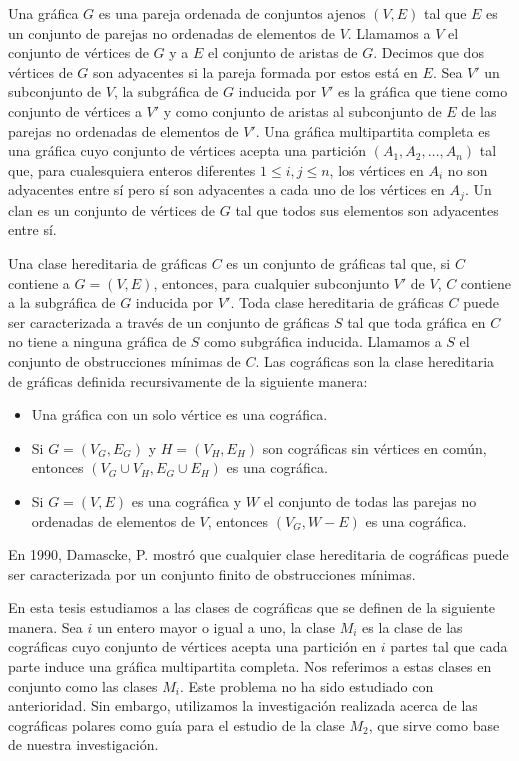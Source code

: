 Una gráfica $G$ es una pareja ordenada de conjuntos ajenos $(V,E)$ tal que $E$ es un conjunto de parejas no ordenadas de elementos de $V$. Llamamos a $V$ el conjunto de vértices de $G$ y a $E$ el conjunto de aristas de $G$. Decimos que dos vértices de $G$ son adyacentes si la pareja formada por estos está en $E$. Sea $V'$ un subconjunto de $V$, la subgráfica de $G$ inducida por $V'$ es la gráfica que tiene como conjunto de vértices a $V'$ y como conjunto de aristas al subconjunto de $E$ de las parejas no ordenadas de elementos de $V'$. Una gráfica multipartita completa es una gráfica cuyo conjunto de vértices acepta una partición $(A_1, A_2,\dots, A_n)$ tal que, para cualesquiera enteros diferentes $1\le i,j \le n$, los vértices en $A_i$ no son adyacentes entre sí pero sí son adyacentes a cada uno de los vértices en $A_j$. Un clan es un conjunto de vértices de $G$ tal que todos sus elementos son adyacentes entre sí.

Una clase hereditaria de gráficas $C$ es un conjunto de gráficas tal que, si $C$ contiene a $G=(V,E)$, entonces, para cualquier subconjunto $V'$ de $V$, $C$ contiene a la subgráfica de $G$ inducida por $V'$. Toda clase hereditaria de gráficas $C$ puede ser caracterizada a través de un conjunto de gráficas $S$ tal que toda gráfica en $C$ no tiene a ninguna gráfica de $S$ como subgráfica inducida. Llamamos a $S$ el conjunto de obstrucciones mínimas de $C$. Las cográficas son la clase hereditaria de gráficas definida recursivamente de la siguiente manera:

\begin{itemize}
    \item Una gráfica con un solo vértice es una cográfica.
    \item Si $G=(V_G,E_G)$ y $H=(V_H,E_H)$ son cográficas sin vértices en común, entonces $(V_G\cup V_H, E_G \cup E_H)$ es una cográfica.
    \item Si $G=(V,E)$ es una cográfica y $W$ el conjunto de todas las parejas no ordenadas de elementos de $V$, entonces $(V_G, W-E)$ es una cográfica.
\end{itemize}

En 1990, Damascke, P. \cite{Damaschke} mostró que cualquier clase hereditaria de cográficas puede ser caracterizada por un conjunto finito de obstrucciones mínimas.

En esta tesis estudiamos a las clases de cográficas que se definen de la siguiente manera. Sea $i$ un entero mayor o igual a uno, la clase $M_i$ es la clase de las cográficas cuyo conjunto de vértices acepta una partición en $i$ partes tal que cada parte induce una gráfica multipartita completa. Nos referimos a estas clases en conjunto como las clases $M_i$. Este problema no ha sido estudiado con anterioridad. Sin embargo, utilizamos la investigación realizada acerca de las cográficas polares como guía para el estudio de la clase $M_2$, que sirve como base de nuestra investigación.

